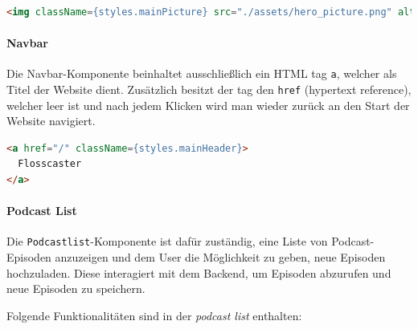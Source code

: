\documentclass{article}
\begin{document}
\begin{lstlisting}[label=lst:frontend-hero-image, language=html, caption=Implementation des Hero-Bilds]
<img className={styles.mainPicture} src="./assets/hero_picture.png" alt="Hero Section"/>
\end{lstlisting}

\paragraph{Navbar}
Die Navbar-Komponente beinhaltet ausschließlich ein HTML tag \texttt{a}, welcher als Titel der Website dient. Zusätzlich besitzt der tag den \texttt{href} (hypertext reference), welcher leer ist und nach jedem Klicken wird man wieder zurück an den Start der Website navigiert.

\begin{lstlisting}[label=lst:frontend-navbar, language=html, caption=Implementation der Navbar]
<a href="/" className={styles.mainHeader}>
  Flosscaster
</a>
\end{lstlisting}

\paragraph{Podcast List}
Die \texttt{Podcastlist}-Komponente ist dafür zuständig, eine Liste von Podcast-Episoden anzuzeigen und dem User die Möglichkeit zu geben, neue Episoden hochzuladen. Diese interagiert mit dem Backend, um Episoden abzurufen und neue Episoden zu speichern.

Folgende Funktionalitäten sind in der \textit{podcast list} enthalten:
\end{document}
